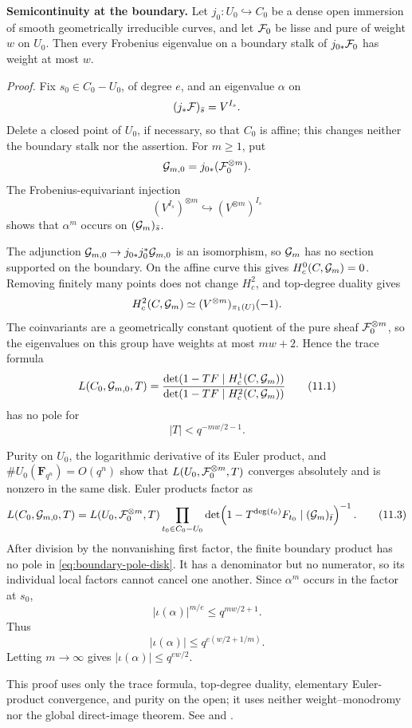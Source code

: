 \begin{foundation}
\label{found:boundary-semicontinuity}
\textbf{Semicontinuity at the boundary.}
Let \(j_0:U_0\hookrightarrow C_0\) be a dense open immersion of smooth
geometrically irreducible curves, and let \(\mathcal F_0\) be lisse and pure of
weight \(w\) on \(U_0\).  Then every Frobenius eigenvalue on a boundary
stalk of \(j_{0*}\mathcal F_0\) has weight at most \(w\).

\smallskip
\emph{Proof.}
Fix \(s_0\in C_0-U_0\), of degree \(e\), and an eigenvalue
\(\alpha\) on
\[
  (j_*\mathcal F)_{\bar s}=V^{I_s}.
\]
Delete a closed point of \(U_0\), if necessary, so that \(C_0\) is
affine; this changes neither the boundary stalk nor the assertion.  For
\(m\ge1\), put
\[
  \mathcal G_{m,0}=j_{0*}(\mathcal F_0^{\otimes m}).
\]
The Frobenius-equivariant injection
\[
  (V^{I_s})^{\otimes m}\hookrightarrow(V^{\otimes m})^{I_s}
\]
shows that \(\alpha^m\) occurs on
\((\mathcal G_m)_{\bar s}\).

The adjunction
\(\mathcal G_{m,0}\to j_{0*}j_0^*\mathcal G_{m,0}\) is an isomorphism, so
\(\mathcal G_m\) has no section supported on the boundary.  On the affine
curve this gives \(H_c^0(C,\mathcal G_m)=0\).  Removing finitely many points
does not change \(H_c^2\), and top-degree duality gives
\[
 H_c^2(C,\mathcal G_m)
 \simeq(V^{\otimes m})_{\pi_1(U)}(-1).
\]
The coinvariants are a geometrically constant quotient of the pure
sheaf \(\mathcal F_0^{\otimes m}\), so the eigenvalues on this group have
weights at most \(mw+2\).  Hence the trace formula
\[
 L(C_0,\mathcal G_{m,0},T)
 =
 \frac{\det(1-TF\mid H_c^1(C,\mathcal G_m))}
      {\det(1-TF\mid H_c^2(C,\mathcal G_m))}
\tag{11.1}\label{eq:boundary-trace-ratio}
\]
has no pole for
\[
  |T|<q^{-mw/2-1}.
\tag{11.2}\label{eq:boundary-pole-disk}
\]

Purity on \(U_0\), the logarithmic derivative of its Euler product, and
\(\#U_0(\mathbf F_{q^n})=O(q^n)\) show that
\(L(U_0,\mathcal F_0^{\otimes m},T)\) converges absolutely and is nonzero in
the same disk.  Euler products factor as
\[
 L(C_0,\mathcal G_{m,0},T)
 =
 L(U_0,\mathcal F_0^{\otimes m},T)
 \prod_{t_0\in C_0-U_0}
 \det\!\left(
  1-T^{\deg(t_0)}F_{t_0}\mid(\mathcal G_m)_{\bar t}
 \right)^{-1}.
\tag{11.3}\label{eq:boundary-euler-factorization}
\]
After division by the nonvanishing first factor, the finite boundary
product has no pole in \cref{eq:boundary-pole-disk}.  It has a
denominator but no numerator, so its individual local factors cannot
cancel one another.  Since \(\alpha^m\) occurs in the factor at \(s_0\),
\[
 |\iota(\alpha)|^{m/e}\le q^{mw/2+1}.
\]
Thus
\[
 |\iota(\alpha)|\le q^{e(w/2+1/m)}.
\]
Letting \(m\to\infty\) gives
\(|\iota(\alpha)|\le q^{ew/2}\).

This proof uses only the trace formula, top-degree duality, elementary
Euler-product convergence, and purity on the open; it uses neither
weight--monodromy nor the global direct-image theorem.  See
\cite[Proposition~2.3.0.1]{StanfordL19} and
\cite[Chapter~I, Section~2]{KiehlWeissauer}.
\end{foundation}

